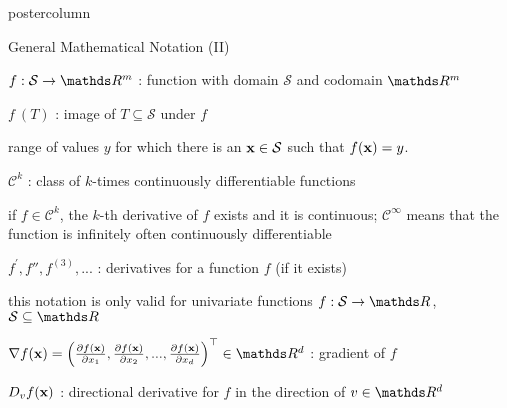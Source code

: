 \documentclass[11pt,compress,t,notes=noshow, xcolor=table]{beamer}
\begin{document}
\begin{frame}[fragile]{}
\begin{columns}
\begin{column}{.31\textwidth}
\begin{beamercolorbox}[center]{postercolumn}
\begin{minipage}{.98\textwidth}
{						\begin{myblock}{General Mathematical Notation (II)}
						\begin{codebox}
							 $f: \mathcal{S} \to \R^m$ : function with domain $\mathcal{S}$ and codomain $\R^m$
						\end{codebox}
						\hspace*{1ex}  %
						\begin{codebox}
							 $f~(T)$ : image of $T \subseteq \mathcal{S}$ under $f$
						\end{codebox}
						\hspace*{1ex} range of values $y$ for which there is an $\mathbf{x} \in \mathcal{S}$ such that $f(\mathbf{x}) = y$. \\
						\begin{codebox}
							 $\mathcal{C}^k$ : class of $k$-times continuously differentiable functions
						\end{codebox}
						\hspace*{1ex} if $f \in \mathcal{C}^k$, the $k$-th derivative of $f$ exists and it is continuous; $\mathcal{C}^\infty$ means that the function is infinitely often continuously differentiable \\
						\begin{codebox}
							 $f^\prime, f'', f^{(3)}, ...$ : derivatives for a function $f$ (if it exists)
						\end{codebox}
						\hspace*{1ex} this notation is only valid for univariate functions $f: \mathcal{S} \to \R$, $\mathcal{S} \subseteq \R$ \\
						\begin{codebox}
							 $\nabla f(\xv) = \left(\frac{\partial f(\xv)}{\partial x_1}, \frac{\partial f(\xv)}{\partial x_2}, ..., \frac{\partial f(\xv)}{\partial x_d}\right)^\top \in \R^d$ : gradient of $f$
						\end{codebox}
						\hspace*{1ex} %
						\begin{codebox}
							 $D_v f(\mathbf{x})$ : directional derivative for $f$ in the direction of $v \in \R^d$
						\end{codebox}
						\hspace*{1ex} %

\end{myblock}}
\end{minipage}
\end{beamercolorbox}
\end{column}
\end{columns}
\end{frame}
\end{document}
